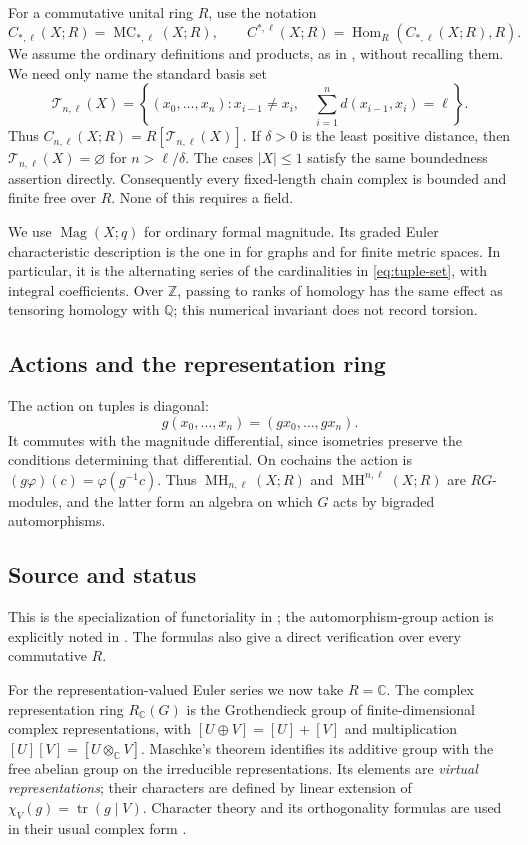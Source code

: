 \documentclass[11pt,a4paper]{article}
\newcommand{\defn}[1]{\textsl{\color{darkblue} #1}}
\numberwithin{equation}{section}
\theoremstyle{definition}
\theoremstyle{remark}
\newcommand{\Z}{\mathbb Z}
\newcommand{\Q}{\mathbb Q}
\newcommand{\C}{\mathbb C}
\newcommand{\G}{G}
\newcommand{\MH}{\operatorname{MH}}
\newcommand{\MC}{\operatorname{MC}}
\newcommand{\Mag}{\operatorname{Mag}}
\newcommand{\Hom}{\operatorname{Hom}}
\newcommand{\tr}{\operatorname{tr}}
\newcommand{\RC}{R_{\C}}
\newcommand{\source}{\subsection*{\color{darkblue}Source and status}}
\begin{document}
For a commutative unital ring $R$, use the notation
\[
 C_{*,\ell}(X;R)=\MC_{*,\ell}(X;R),\qquad
 C^{*,\ell}(X;R)=\Hom_R(C_{*,\ell}(X;R),R).
\]
We assume the ordinary definitions and products, as in
\cite{HW,LS,Hepworth,AI}, without recalling them.  We need only name the
standard basis set
\begin{equation}\label{eq:tuple-set}
 \mathcal T_{n,\ell}(X)=
 \left\{(x_0,\ldots,x_n): x_{i-1}\ne x_i,\quad
             \sum_{i=1}^n d(x_{i-1},x_i)=\ell\right\}.
\end{equation}
Thus $C_{n,\ell}(X;R)=R[\mathcal T_{n,\ell}(X)]$.
If $\delta>0$ is the least positive distance, then
$\mathcal T_{n,\ell}(X)=\varnothing$ for $n>\ell/\delta$.
The cases $|X|\leq1$ satisfy the same boundedness assertion directly.
Consequently every fixed-length chain complex is bounded and finite free
over $R$.  None of this requires a field.

We use $\Mag(X;q)$ for ordinary formal magnitude.  Its graded Euler
characteristic description is the one in \cite[Theorem 8]{HW} for graphs
and \cite[Corollary 7.15]{LS} for finite metric spaces.  In particular,
it is the alternating series of the cardinalities in
\eqref{eq:tuple-set}, with integral coefficients.  Over $\Z$, passing
to ranks of homology has the same effect as tensoring homology with
$\Q$; this numerical invariant does not record torsion.

\subsection{Actions and the representation ring}

The action on tuples is diagonal:
\begin{equation}\label{eq:tuple-action}
 g(x_0,\ldots,x_n)=(gx_0,\ldots,gx_n).
\end{equation}
It commutes with the magnitude differential, since isometries preserve
the conditions determining that differential.  On cochains the action is
$(g\varphi)(c)=\varphi(g^{-1}c)$.  Thus
$\MH_{n,\ell}(X;R)$ and $\MH^{n,\ell}(X;R)$ are $R\G$-modules, and the
latter form an algebra on which $\G$ acts by bigraded automorphisms.
\source This is the specialization of functoriality in
\cite{HW,LS,Hepworth}; the automorphism-group action is explicitly noted
in \cite[\S1.1]{HW}.  The formulas also give a direct verification over
every commutative $R$.

For the representation-valued Euler series we now take $R=\C$.
The complex representation ring $\RC(\G)$ is the Grothendieck group of
finite-dimensional complex representations, with
$[U\oplus V]=[U]+[V]$ and multiplication $[U][V]=[U\otimes_\C V]$.
Maschke's theorem identifies its additive group with the free abelian
group on the irreducible representations.  Its elements are
\defn{virtual representations}; their characters are defined by linear
extension of $\chi_V(g)=\tr(g\mid V)$.  Character theory and its
orthogonality formulas are used in their usual complex form
\cite[Chs.~1--2]{Serre}.
\end{document}
